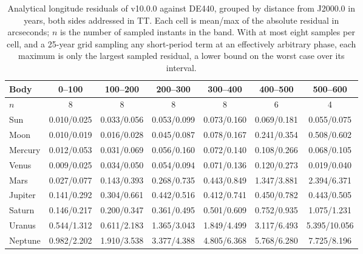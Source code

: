 \documentclass[11pt]{article}
\begin{document}
\begin{table}[!htbp]
\centering
\small
\begin{tabular}{@{}lcccccc@{}}
\toprule
Body & 0--100 & 100--200 & 200--300 & 300--400 & 400--500 & 500--600 \\
\midrule
$n$ & 8 & 8 & 8 & 8 & 6 & 4 \\
Sun & 0.010/0.025 & 0.033/0.056 & 0.053/0.099 & 0.073/0.160 & 0.069/0.181 & 0.055/0.075 \\
Moon & 0.010/0.019 & 0.016/0.028 & 0.045/0.087 & 0.078/0.167 & 0.241/0.354 & 0.508/0.602 \\
Mercury & 0.012/0.053 & 0.031/0.069 & 0.056/0.160 & 0.072/0.140 & 0.108/0.266 & 0.068/0.105 \\
Venus & 0.009/0.025 & 0.034/0.050 & 0.054/0.094 & 0.071/0.136 & 0.120/0.273 & 0.019/0.040 \\
Mars & 0.027/0.077 & 0.143/0.393 & 0.268/0.735 & 0.443/0.849 & 1.347/3.881 & 2.394/6.371 \\
Jupiter & 0.141/0.292 & 0.304/0.661 & 0.442/0.516 & 0.412/0.741 & 0.450/0.782 & 0.443/0.505 \\
Saturn & 0.146/0.217 & 0.200/0.347 & 0.361/0.495 & 0.501/0.609 & 0.752/0.935 & 1.075/1.231 \\
Uranus & 0.544/1.312 & 0.611/2.183 & 1.365/3.043 & 1.849/4.499 & 3.117/6.493 & 5.395/10.056 \\
Neptune & 0.982/2.202 & 1.910/3.538 & 3.377/4.388 & 4.805/6.368 & 5.768/6.280 & 7.725/8.196 \\
\bottomrule
\end{tabular}
\caption{Analytical longitude residuals of v10.0.0 against DE440, grouped by distance from J2000.0 in years, both sides addressed in TT. Each cell is mean/max of the absolute residual in arcseconds; $n$ is the number of sampled instants in the band. With at most eight samples per cell, and a 25-year grid sampling any short-period term at an effectively arbitrary phase, each maximum is only the largest sampled residual, a lower bound on the worst case over its interval.}
\label{tab:fullrange}
\end{table}
\end{document}

